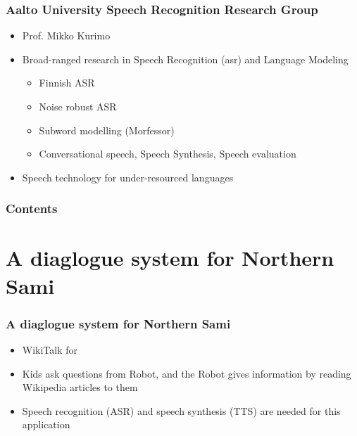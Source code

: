 %
\begin{frame}
\frametitle{Aalto University Speech Recognition Research Group}
\begin{itemize}
\item Prof. Mikko Kurimo
\item Broad-ranged research in Speech Recognition (asr) and Language Modeling
\begin{itemize}
\item Finnish ASR
\item Noise robust ASR
\item Subword modelling (Morfessor)
\item Conversational speech, Speech Synthesis, Speech evaluation
\end{itemize}

\item Speech technology for under-resourced languages
\end{itemize}
\end{frame}


\begin{frame}
\frametitle{Contents}
\tableofcontents
\end{frame}





\section{A diaglogue system for Northern Sami}
\begin{frame}
\frametitle{A diaglogue system for Northern Sami}
\begin{itemize}
\item WikiTalk for \ns
\item Kids ask questions from Robot, and the Robot gives information by reading Wikipedia articles to them
\item Speech recognition (ASR) and speech synthesis (TTS) are needed for this application
\end{itemize}
\end{frame}

